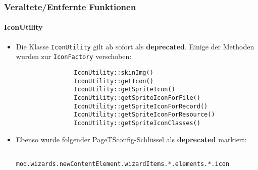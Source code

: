 \begin{frame}[fragile]
	\frametitle{Veraltete/Entfernte Funktionen}
	\framesubtitle{IconUtility}


	\begin{itemize}

		\item Die Klasse \texttt{IconUtility} gilt ab sofort als \textbf{deprecated}.\newline
			Einige der Methoden wurden zur \texttt{IconFactory} verschoben:

			\begin{lstlisting}
				IconUtility::skinImg()
				IconUtility::getIcon()
				IconUtility::getSpriteIcon()
				IconUtility::getSpriteIconForFile()
				IconUtility::getSpriteIconForRecord()
				IconUtility::getSpriteIconForResource()
				IconUtility::getSpriteIconClasses()
			\end{lstlisting}

		\item Ebenso wurde folgender PageTSconfig-Schlüssel als \textbf{deprecated} markiert:

			\begin{lstlisting}
				mod.wizards.newContentElement.wizardItems.*.elements.*.icon
			\end{lstlisting}

	\end{itemize}

\end{frame}


